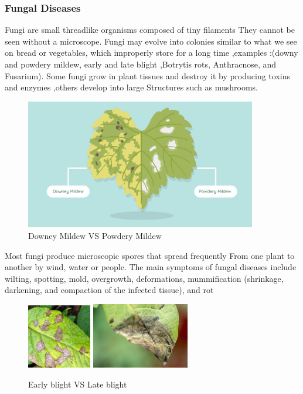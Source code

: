 \subsubsection{Fungal Diseases}
Fungi are small threadlike organisms composed of tiny filaments They cannot be seen without a microscope. Fungi may evolve into colonies similar to what we see on bread or vegetables, which improperly store for a long time ,examples :(downy and powdery mildew,
early and late blight ,Botrytis rots, Anthracnose, and Fusarium). Some fungi grow in plant tissues and destroy it by producing toxins and enzymes ,others develop into large Structures such as mushrooms.\cite{book1}
\begin{figure}[!h]
    \centering
    \includegraphics[width=0.9\textwidth]{chapters/chapter01/fig01/downy-mildew.jpg}
    \caption{Downey Mildew VS Powdery Mildew}
    
\end{figure}
\newpage
Most fungi produce microscopic spores  that spread frequently From one plant to another by wind, water or people. The main symptoms of fungal diseases include wilting, spotting, mold, overgrowth, deformations, mummification (shrinkage, darkening, and compaction of the infected tissue), and rot \cite{art2}
\begin{figure}[!h]
    \hspace{2.1cm}
    \includegraphics[width=0.25\textwidth]{chapters/chapter01/fig01/early-blight.jpg}
    \hspace{3cm}
    \includegraphics[width=0.38\textwidth]{chapters/chapter01/fig01/late-blight.jpg}
    \caption{Early blight VS Late blight }
    \label{fig:my_label}
\end{figure}

